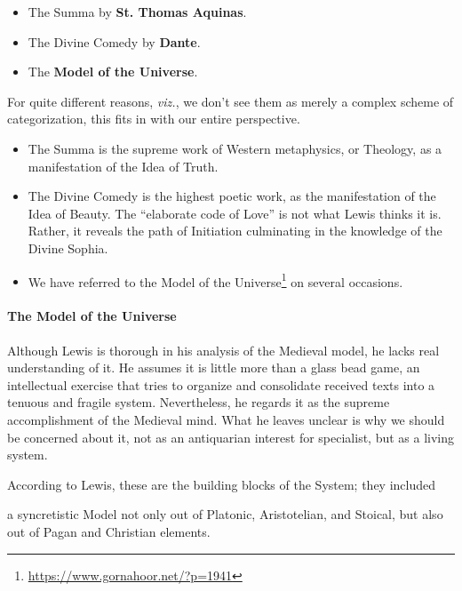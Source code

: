 \begin{itemize}


\item The Summa by \textbf{St. Thomas Aquinas}.

\item The Divine Comedy by \textbf{Dante}.

\item The \textbf{Model of the Universe}.
\end{itemize}


For quite different reasons, \emph{viz.}, we don't see them as merely a complex scheme of categorization, this fits in with our entire perspective.

\begin{itemize}


\item The Summa is the supreme work of Western metaphysics, or Theology, as a manifestation of the Idea of Truth.

\item The Divine Comedy is the highest poetic work, as the manifestation of the Idea of Beauty. The ``elaborate code of Love'' is not what Lewis thinks it is. Rather, it reveals the path of Initiation culminating in the knowledge of the Divine Sophia.

\item We have referred to the Model of the Universe\footnote{\url{https://www.gornahoor.net/?p=1941}} on several occasions.
\end{itemize}


\paragraph{The Model of the Universe}


Although Lewis is thorough in his analysis of the Medieval model, he lacks real understanding of it. He assumes it is little more than a glass bead game, an intellectual exercise that tries to organize and consolidate received texts into a tenuous and fragile system. Nevertheless, he regards it as the supreme accomplishment of the Medieval mind. What he leaves unclear is why we should be concerned about it, not as an antiquarian interest for specialist, but as a living system.

According to Lewis, these are the building blocks of the System; they included

\begin{quotex}
a syncretistic Model not only out of Platonic, Aristotelian, and Stoical, but also out of Pagan and Christian elements.
\end{quotex}


